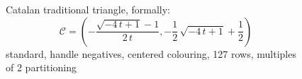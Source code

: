 
\begin{figure}[p]

    \noindent{}

    \captionsetup{singlelinecheck=off}
    \caption[.]{
        Catalan traditional triangle, formally: 
        \begin{displaymath}
            \mathcal{C}=\left(-\frac{\sqrt{-4 \, t + 1} - 1}{2 \, t}, -\frac{1}{2} \, \sqrt{-4 \, t + 1} + \frac{1}{2}\right)
        \end{displaymath} %
        standard, handle negatives, centered colouring, 127 rows, multiples of 2 partitioning
        }

    \label{fig:catalan-traditional-standard-handle-negatives-centered-colouring-127-rows-multiples-of-2-partitioning-triangle}

\end{figure}
